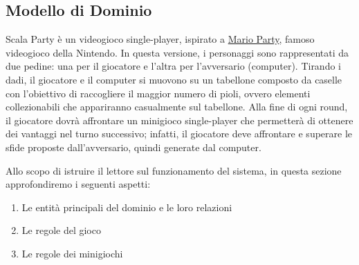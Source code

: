 \subsection{Modello di Dominio}
Scala Party è un videogioco single-player, ispirato a 
\href{https://it.wikipedia.org/wiki/Mario_Party_(serie)}{Mario Party},
famoso videogioco della Nintendo. In questa versione, i personaggi 
sono rappresentati da due pedine: una per il giocatore e l'altra per
l'avversario (computer). Tirando i dadi, il giocatore e il computer 
si muovono su un tabellone composto da caselle con l'obiettivo di
raccogliere il maggior numero di pioli, ovvero elementi collezionabili
che appariranno casualmente sul tabellone. Alla fine di ogni round,
il giocatore dovrà affrontare un minigioco single-player che permetterà
di ottenere dei vantaggi nel turno successivo; infatti, il giocatore
deve affrontare e superare le sfide proposte dall'avversario, quindi 
generate dal computer.

Allo scopo di istruire il lettore sul funzionamento del sistema,
in questa sezione approfondiremo i seguenti aspetti:
\begin{enumerate}
    \item Le entità principali del dominio e le loro relazioni
    \item Le regole del gioco
    \item Le regole dei minigiochi
\end{enumerate}
